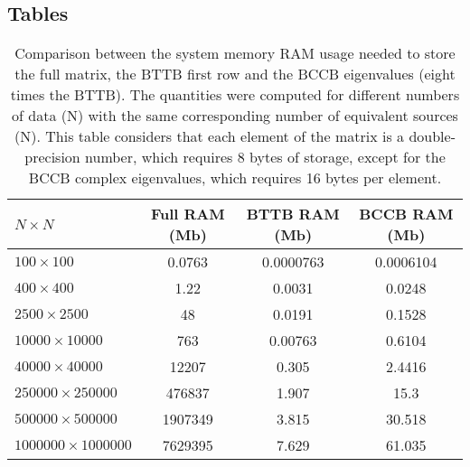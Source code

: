 \documentclass[paper]{geophysics}
\begin{document}
\subsection{Tables}

\begin{table}[h]
	\begin{center}
		\begin{tabular}{|l|c|c|c|}
			\hline
			\textbf{$N \times N$} & \textbf{Full RAM (Mb)} & \textbf{BTTB RAM (Mb)}  & \textbf{BCCB RAM (Mb)}\\
			\hline 
			$100 \times 100$ & 0.0763 & 0.0000763 & 0.0006104\\
			\hline
			$400 \times 400$ & 1.22 & 0.0031 & 0.0248\\
			\hline
			$2500 \times 2500$ & 48 & 0.0191 & 0.1528\\
			\hline
			$10000 \times 10000$ & 763 & 0.00763 & 0.6104\\
			\hline
			$40000 \times 40000$ & 12207 & 0.305 & 2.4416 \\
			\hline
			$250000 \times 250000$ & 476837 & 1.907 & 15.3 \\
			\hline
			$500000 \times 500000$ & 1907349 & 3.815 & 30.518 \\
			\hline
			$1000000 \times 1000000$ & 7629395 & 7.629 & 61.035 \\
			\hline
		\end{tabular}
		\caption{Comparison between the system memory RAM usage needed to store the full matrix, the BTTB first row and the BCCB eigenvalues (eight times the BTTB). The quantities were computed for different numbers of data (N) with the same corresponding number of equivalent sources (N). This table considers that each element of the matrix is a double-precision number, which requires 8 bytes of storage, except for the BCCB complex eigenvalues, which requires 16 bytes per element.}
	\end{center}
\end{table} 
\end{document}
